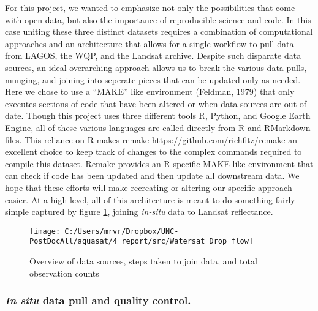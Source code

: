 \documentclass[]{article}
\begin{document}
For this project, we wanted to emphasize not only the possibilities that
come with open data, but also the importance of reproducible science and
code. In this case uniting these three distinct datasets requires a
combination of computational approaches and an architecture that allows
for a single workflow to pull data from LAGOS, the WQP, and the Landsat
archive. Despite such disparate data sources, an ideal overarching
approach allows us to break the various data pulls, munging, and joining
into seperate pieces that can be updated only as needed. Here we chose
to use a ``MAKE'' like environment (Feldman, 1979) that only executes
sections of code that have been altered or when data sources are out of
date. Though this project uses three different tools R, Python, and
Google Earth Engine, all of these various languages are called directly
from R and RMarkdown files. This reliance on R makes remake
\url{https://github.com/richfitz/remake} an excellent choice to keep
track of changes to the complex commands required to compile this
dataset. Remake provides an R specific MAKE-like environment that can
check if code has been updated and then update all downstream data. We
hope that these efforts will make recreating or altering our specific
approach easier. At a high level, all of this architecture is meant to
do something fairly simple captured by figure \ref{fig:fig1}, joining
\emph{in-situ} data to Landsat reflectance.

\begin{figure}
\texttt{[image: C:/Users/mrvr/Dropbox/UNC-PostDocAll/aquasat/4\_report/src/Watersat\_Drop\_flow]} \caption{Overview of data sources, steps taken to join data, and total observation counts}\label{fig:fig1}
\end{figure}

\hypertarget{in-situ-data-pull-and-quality-control.}{%
\subsubsection{\texorpdfstring{\emph{In situ} data pull and quality
control.}{In situ data pull and quality control.}}\label{in-situ-data-pull-and-quality-control.}}
\end{document}

